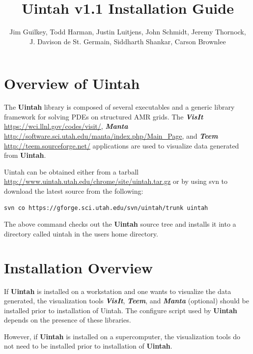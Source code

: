 \documentclass[12pt]{article}
\begin{document}
\title{Uintah v1.1 Installation Guide}

\author{Jim Guilkey, Todd Harman, Justin Luitjens, John Schmidt,
  Jeremy Thornock,\\
  J. Davison de St. Germain, Siddharth Shankar,
  Carson Brownlee}

\maketitle

\newpage

\tableofcontents

\newpage

\section{Overview of Uintah} \label{sec:overview}

The \textbf{Uintah} library is composed of several executables and a
generic library framework for solving PDEs on structured AMR grids.
The \textbf{\emph{VisIt}} \url{https://wci.llnl.gov/codes/visit/},
\textbf{\emph{Manta}}
\url{http://software.sci.utah.edu/manta/index.php/Main_Page}, and
\textbf{\emph{Teem}} \url{http://teem.sourceforge.net/} applications
are used to visualize data generated from \textbf{Uintah}.

Uintah can be obtained either from a tarball 
\url{http://www.uintah.utah.edu/chrome/site/uintah.tar.gz} or by
using svn to download the latest source from the following:

\begin{verbatim}
svn co https://gforge.sci.utah.edu/svn/uintah/trunk uintah
\end{verbatim}
The above command checks out the \textbf{Uintah} source tree and
installs it into a directory called uintah in the users home
directory.


\section{Installation Overview}

If \textbf{Uintah} is installed on a workstation and one wants to
visualize the data generated, the visualization tools
\textbf{\emph{VisIt}}, \textbf{\emph{Teem}}, and \textbf{\emph{Manta}}
(optional) should be installed prior to installation of Uintah.  The
configure script used by \textbf{Uintah} depends on the presence of
these libraries.

However, if \textbf{Uintah} is installed on a supercomputer, the
visualization tools do not need to be installed prior to installation
of \textbf{Uintah}.
\end{document}
